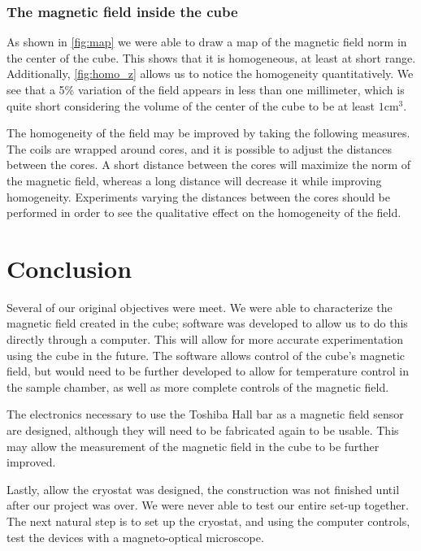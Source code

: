 \documentclass[journal]{IEEEtran}
\begin{document}
\subsubsection{The magnetic field inside the cube}

As shown in \figurename \ref{fig:map} we were able to draw a map of the magnetic field norm in the center of the cube. This shows that it is homogeneous, at least at short range. Additionally, \figurename \ref{fig:homo_z} allows us to notice the homogeneity quantitatively. We see that a 5\% variation of the field appears in less than one millimeter, which is quite short considering the volume of the center of the cube to be at least $1\mathrm{cm^3}$.

The homogeneity of the field may be improved by taking the following measures. The coils are wrapped around cores, and it is possible to adjust the distances between the cores. A short distance between the cores will maximize the norm of the magnetic field, whereas a long distance will decrease it while improving homogeneity. Experiments varying the distances between the cores should be performed in order to see the qualitative effect on the homogeneity of the field. 

\section{Conclusion}

Several of our original objectives were meet. We were able to characterize the magnetic field created in the cube; software was developed to allow us to do this directly through a computer. This will allow for more accurate experimentation using the cube in the future. The software allows control of the cube's magnetic field, but would need to be further developed to allow for temperature control in the sample chamber, as well as more complete controls of the magnetic field.

The electronics necessary to use the Toshiba Hall bar as a magnetic field sensor are designed, although they will need to be fabricated again to be usable. This may allow the measurement of the magnetic field in the cube to be further improved.

Lastly, allow the cryostat was designed, the construction was not finished until after our project was over. We were never able to test our entire set-up together. The next natural step is to set up the cryostat, and using the computer controls, test the devices with a magneto-optical microscope.
\end{document}
